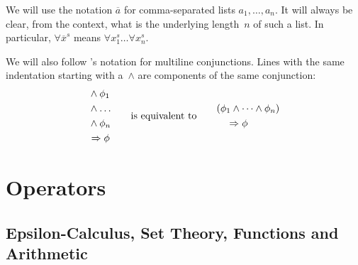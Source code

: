 \documentclass[11pt, a4paper, oneside]{article}
\begin{document}
We will use the notation $\overline{a}$ for comma-separated lists $a_1,\dots,a_n$.  It will always be clear, from the context, what is the underlying length~$n$ of such a list.  In particular, $\forall \overline{x}^s$ means $\forall x_1^s \dots \forall x_n^s$.

We will also follow \TLA's notation for multiline conjunctions.  Lines with the same indentation starting with a~$\wedge$ are components of the same conjunction:
\begin{gather*}
    \begin{aligned}
        &\wedge \phi_1 \\
        &\wedge \dots \\
        &\wedge \phi_n \\
        &\Rightarrow \phi
    \end{aligned}
    \qquad\text{is equivalent to}\qquad
    \begin{aligned}
        &(\phi_1 \wedge \dots \wedge \phi_n) \\
        &\quad \Rightarrow \phi
    \end{aligned}
\end{gather*}


\section{Operators}
\label{sec:operators}


    \subsection{Epsilon-Calculus, Set Theory, Functions and Arithmetic}
\end{document}
